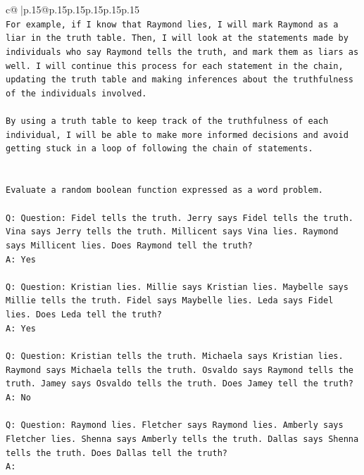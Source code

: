 \documentclass{article}
\begin{document}
{\begin{supertabular}{c@{$\;$}|p{.15\linewidth}@{}p{.15\linewidth}p{.15\linewidth}p{.15\linewidth}p{.15\linewidth}p{.15\linewidth}}
{{{\\ 
\texttt{For example, if I know that Raymond lies, I will mark Raymond as a liar in the truth table. Then, I will look at the statements made by individuals who say Raymond tells the truth, and mark them as liars as well. I will continue this process for each statement in the chain, updating the truth table and making inferences about the truthfulness of the individuals involved. } \\
\\ 
\texttt{By using a truth table to keep track of the truthfulness of each individual, I will be able to make more informed decisions and avoid getting stuck in a loop of following the chain of statements.} \\
\\ 
\\ 
\texttt{Evaluate a random boolean function expressed as a word problem.} \\
\\ 
\texttt{Q: Question: Fidel tells the truth. Jerry says Fidel tells the truth. Vina says Jerry tells the truth. Millicent says Vina lies. Raymond says Millicent lies. Does Raymond tell the truth?} \\
\texttt{A: Yes} \\
\\ 
\texttt{Q: Question: Kristian lies. Millie says Kristian lies. Maybelle says Millie tells the truth. Fidel says Maybelle lies. Leda says Fidel lies. Does Leda tell the truth?} \\
\texttt{A: Yes} \\
\\ 
\texttt{Q: Question: Kristian tells the truth. Michaela says Kristian lies. Raymond says Michaela tells the truth. Osvaldo says Raymond tells the truth. Jamey says Osvaldo tells the truth. Does Jamey tell the truth?} \\
\texttt{A: No} \\
\\ 
\texttt{Q: Question: Raymond lies. Fletcher says Raymond lies. Amberly says Fletcher lies. Shenna says Amberly tells the truth. Dallas says Shenna tells the truth. Does Dallas tell the truth?} \\
\texttt{A:} \\
            }
        }
    }
     \\ \\


\end{supertabular}}
\end{document}
